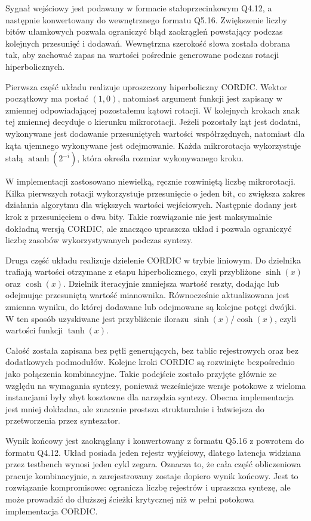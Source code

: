 \documentclass[12pt, a4paper, oneside]{scrreprt}
\begin{document}
Sygnał wejściowy jest podawany w formacie stałoprzecinkowym Q4.12, a następnie konwertowany
do wewnętrznego formatu Q5.16. Zwiększenie liczby bitów ułamkowych pozwala ograniczyć błąd
zaokrągleń powstający podczas kolejnych przesunięć i dodawań. Wewnętrzna szerokość słowa
została dobrana tak, aby zachować zapas na wartości pośrednie generowane podczas rotacji
hiperbolicznych.

Pierwsza część układu realizuje uproszczony hiperboliczny CORDIC. Wektor początkowy
ma postać $(1, 0)$, natomiast argument funkcji jest zapisany w zmiennej odpowiadającej
pozostałemu kątowi rotacji. W kolejnych krokach znak tej zmiennej decyduje o kierunku
mikrorotacji. Jeżeli pozostały kąt jest dodatni, wykonywane jest dodawanie przesuniętych
wartości współrzędnych, natomiast dla kąta ujemnego wykonywane jest odejmowanie.
Każda mikrorotacja wykorzystuje stałą $\operatorname{atanh}(2^{-i})$, która określa
rozmiar wykonywanego kroku.

W implementacji zastosowano niewielką, ręcznie rozwiniętą liczbę mikrorotacji.
Kilka pierwszych rotacji wykorzystuje przesunięcie o jeden bit, co zwiększa zakres
działania algorytmu dla większych wartości wejściowych. Następnie dodany jest krok z
przesunięciem o dwa bity. Takie rozwiązanie nie jest maksymalnie dokładną wersją CORDIC,
ale znacząco upraszcza układ i pozwala ograniczyć liczbę zasobów wykorzystywanych podczas syntezy.

Druga część układu realizuje dzielenie CORDIC w trybie liniowym. Do dzielnika trafiają
wartości otrzymane z etapu hiperbolicznego, czyli przybliżone $\sinh(x)$ oraz $\cosh(x)$.
Dzielnik iteracyjnie zmniejsza wartość reszty, dodając lub odejmując przesuniętą wartość
mianownika. Równocześnie aktualizowana jest zmienna wyniku, do której dodawane lub
odejmowane są kolejne potęgi dwójki. W ten sposób uzyskiwane jest przybliżenie
ilorazu $\sinh(x)/\cosh(x)$, czyli wartości funkcji $\tanh(x)$.

Całość została zapisana bez pętli generujących, bez tablic rejestrowych oraz bez
dodatkowych podmodułów. Kolejne kroki CORDIC są rozwinięte bezpośrednio jako połączenia
kombinacyjne. Takie podejście zostało przyjęte głównie ze względu na wymagania syntezy,
ponieważ wcześniejsze wersje potokowe z wieloma instancjami były zbyt kosztowne dla
narzędzia syntezy. Obecna implementacja jest mniej dokładna, ale znacznie prostsza
strukturalnie i łatwiejsza do przetworzenia przez syntezator.

Wynik końcowy jest zaokrąglany i konwertowany z formatu Q5.16 z powrotem do formatu Q4.12.
Układ posiada jeden rejestr wyjściowy, dlatego latencja widziana przez testbench wynosi
jeden cykl zegara. Oznacza to, że cała część obliczeniowa pracuje kombinacyjnie,
a zarejestrowany zostaje dopiero wynik końcowy. Jest to rozwiązanie kompromisowe:
ogranicza liczbę rejestrów i upraszcza syntezę, ale może prowadzić do dłuższej
ścieżki krytycznej niż w pełni potokowa implementacja CORDIC.
\end{document}
